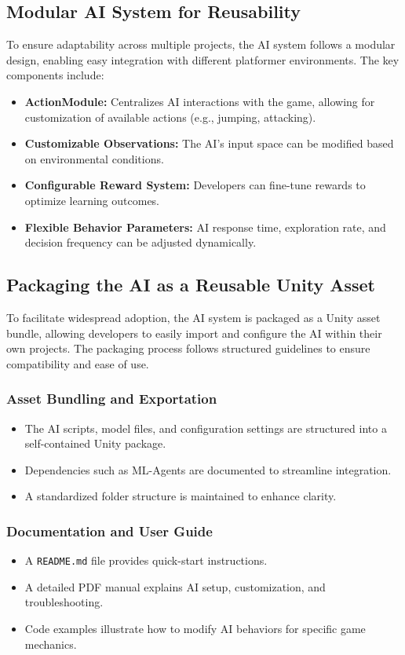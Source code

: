 \documentclass[12pt,oneside,openright,a4paper]{cpe-english-project}
\begin{document}
\subsection{Modular AI System for Reusability}
To ensure adaptability across multiple projects, the AI system follows a modular design, enabling easy integration with different platformer environments. The key components include:
\begin{itemize}
\item  \textbf{ActionModule:} Centralizes AI interactions with the game, allowing for customization of available actions (e.g., jumping, attacking).
\item  \textbf{Customizable Observations:} The AI’s input space can be modified based on environmental conditions.
\item  \textbf{Configurable Reward System:} Developers can fine-tune rewards to optimize learning outcomes.
\item  \textbf{Flexible Behavior Parameters:} AI response time, exploration rate, and decision frequency can be adjusted dynamically.
\end{itemize}
\subsection{Packaging the AI as a Reusable Unity Asset}
To facilitate widespread adoption, the AI system is packaged as a Unity asset bundle, allowing developers to easily import and configure the AI within their own projects. The packaging process follows structured guidelines to ensure compatibility and ease of use.
\subsubsection{Asset Bundling and Exportation}
\begin{itemize}
\item  The AI scripts, model files, and configuration settings are structured into a self-contained Unity package.
\item  Dependencies such as ML-Agents are documented to streamline integration.
\item  A standardized folder structure is maintained to enhance clarity.
\end{itemize}
\subsubsection{Documentation and User Guide}
\begin{itemize}
\item  A \texttt{README.md} file provides quick-start instructions.
\item  A detailed PDF manual explains AI setup, customization, and troubleshooting.
\item  Code examples illustrate how to modify AI behaviors for specific game mechanics.
\end{itemize}
\end{document}
